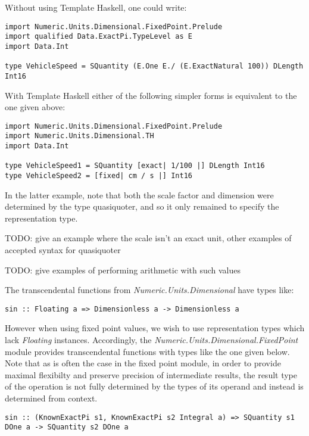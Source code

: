 \documentclass[11pt]{report}
\newcommand{\classname}[1]{\textit{#1}}
\newcommand{\modulename}[1]{\textit{#1}}
\begin{document}
Without using Template Haskell, one could write:

\begin{lstlisting}
import Numeric.Units.Dimensional.FixedPoint.Prelude
import qualified Data.ExactPi.TypeLevel as E
import Data.Int

type VehicleSpeed = SQuantity (E.One E./ (E.ExactNatural 100)) DLength Int16
\end{lstlisting}

With Template Haskell either of the following simpler forms is equivalent to the one given above:

\begin{lstlisting}
import Numeric.Units.Dimensional.FixedPoint.Prelude
import Numeric.Units.Dimensional.TH
import Data.Int

type VehicleSpeed1 = SQuantity [exact| 1/100 |] DLength Int16
type VehicleSpeed2 = [fixed| cm / s |] Int16
\end{lstlisting}

In the latter example, note that both the scale factor and dimension were determined by the type quasiquoter, and so it
only remained to specify the representation type.

TODO: give an example where the scale isn't an exact unit, other examples of accepted syntax for quasiquoter

TODO: give examples of performing arithmetic with such values

The transcendental functions from \modulename{Numeric.Units.Dimensional} have types like:

\begin{lstlisting}
sin :: Floating a => Dimensionless a -> Dimensionless a
\end{lstlisting}

However when using fixed point values, we wish to use representation types which lack \classname{Floating} instances. Accordingly,
the \modulename{Numeric.Units.Dimensional.FixedPoint} module provides transcendental functions with types like the one given below.
Note that as is often the case in the fixed point module, in order to provide maximal flexibilty and preserve precision of
intermediate results, the result type of the operation is not fully determined by the types of its operand and instead is
determined from context.

\begin{lstlisting}
sin :: (KnownExactPi s1, KnownExactPi s2 Integral a) => SQuantity s1 DOne a -> SQuantity s2 DOne a
\end{lstlisting}
\end{document}
